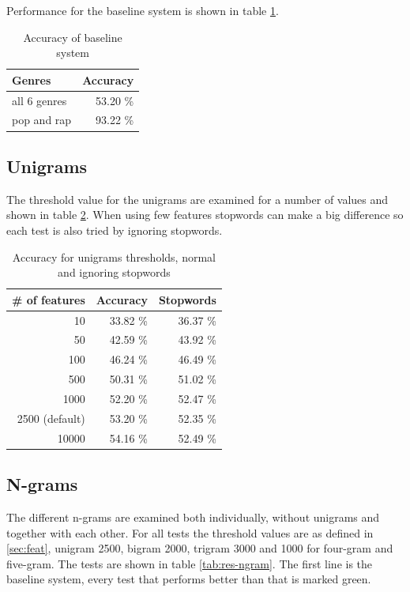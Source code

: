 \documentclass[a4paper, 12pt]{article}
\begin{document}
Performance for the baseline system is shown in table \ref{tab:res-baseline}.

\begin{table}[h]
\begin{center}
    \begin{tabular}{| l | r |}
        \hline
        Genres & Accuracy \\
        \hline
        all 6 genres & 53.20 \% \\
        pop and rap & 93.22 \% \\
        \hline
    \end{tabular}
    \caption{Accuracy of baseline system}
    \label{tab:res-baseline}
\end{center}
\end{table}

\subsection{Unigrams}
\label{sec:unigrams}
The threshold value for the unigrams are examined for a number of values and shown in table \ref{tab:res-uni}.
When using few features stopwords can make a big difference so each test is also tried by ignoring stopwords.

\begin{table}[h]
\begin{center}
    \begin{tabular}{| r | r | r |}
        \hline
        \# of features & Accuracy & Stopwords \\
        \hline
        10  & 33.82 \% & 36.37 \% \\
        50  & 42.59 \% & 43.92 \% \\
        100  & 46.24 \% & 46.49 \% \\
        500  & 50.31 \% & 51.02 \% \\
        1000  & 52.20 \% & 52.47 \% \\
        2500 (default)  & 53.20 \% & 52.35 \% \\
        10000  & 54.16 \% & 52.49 \% \\
        \hline
    \end{tabular}
    \caption{Accuracy for unigrams thresholds, normal and ignoring stopwords}
    \label{tab:res-uni}
\end{center}
\end{table}

\subsection{N-grams}
The different n-grams are examined both individually, without unigrams and together with each other.
For all tests the threshold values are as defined in \ref{sec:feat}, unigram 2500, bigram 2000, trigram 3000 and 1000 for four-gram and five-gram.
The tests are shown in table \ref{tab:res-ngram}.
The first line is the baseline system, every test that performs better than that is marked green.
\end{document}
